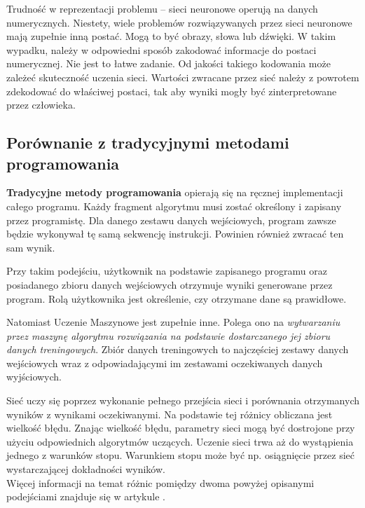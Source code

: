 \begin{enumerate*}
\begin{enumerate*}
\item Trudność w reprezentacji problemu -- sieci neuronowe operują na danych numerycznych. Niestety, wiele problemów rozwiązywanych przez sieci neuronowe mają zupełnie inną postać. Mogą to być obrazy, słowa lub dźwięki. W takim wypadku, należy w odpowiedni sposób zakodować informacje do postaci numerycznej. Nie jest to łatwe zadanie. Od jakości takiego kodowania może zależeć skuteczność uczenia sieci.
Wartości zwracane przez sieć należy z powrotem zdekodować do właściwej postaci, tak aby wyniki mogły być zinterpretowane przez człowieka.
\end{enumerate*}
\end{enumerate*}

\subsection{Porównanie z tradycyjnymi metodami programowania}
\textbf{Tradycyjne metody programowania} opierają się na ręcznej implementacji całego programu. Każdy fragment algorytmu musi zostać określony i zapisany przez programistę. Dla danego zestawu danych wejściowych, program zawsze będzie wykonywał tę samą sekwencję instrukcji. Powinien również zwracać ten sam wynik.

Przy takim podejściu, użytkownik na podstawie zapisanego programu oraz posiadanego zbioru danych wejściowych otrzymuje wyniki generowane przez program. Rolą użytkownika jest określenie, czy otrzymane dane są prawidłowe.

Natomiast Uczenie Maszynowe jest zupełnie inne. Polega ono na \textit{wytwarzaniu przez maszynę algorytmu rozwiązania na podstawie dostarczanego jej zbioru danych treningowych}. Zbiór danych treningowych to najczęściej zestawy danych wejściowych wraz z odpowiadającymi im zestawami oczekiwanych danych wyjściowych.

Sieć uczy się poprzez wykonanie pełnego przejścia sieci i porównania otrzymanych wyników z wynikami oczekiwanymi. Na podstawie tej różnicy obliczana jest wielkość błędu. Znając wielkość błędu, parametry sieci mogą być dostrojone przy użyciu odpowiednich algorytmów uczących. Uczenie sieci trwa aż do wystąpienia jednego z warunków stopu. Warunkiem stopu może być np. osiągnięcie przez sieć wystarczającej dokładności wyników. \\
Więcej informacji na temat różnic pomiędzy dwoma powyżej opisanymi podejściami znajduje się w artykule \cite{mlVersusTradition}.

